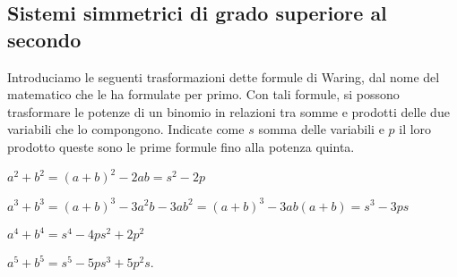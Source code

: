 \subsection{Sistemi simmetrici di grado superiore al secondo}
Introduciamo le seguenti trasformazioni dette formule di Waring, dal nome del matematico che le ha formulate per primo. Con tali formule, si possono trasformare le potenze di un binomio in relazioni tra somme e prodotti delle due variabili che lo compongono. Indicate come $s$ somma delle variabili e $p$ il loro prodotto queste sono le prime formule fino alla potenza quinta.
\begin{itemize*}
\item $ a^2+b^2=(a+b)^2-2{ab}=s^2-2p $
\item $ a^3+b^3=(a+b)^3-3a^2b-3ab^2=(a+b)^3-3{ab}(a+b)=s^3-3{ps} $
\item $ a^4+b^4=s^4-4{ps}^2+2p^2 $
\item $ a^5+b^5=s^5-5{ps}^3+5p^2s $.
\end{itemize*}

